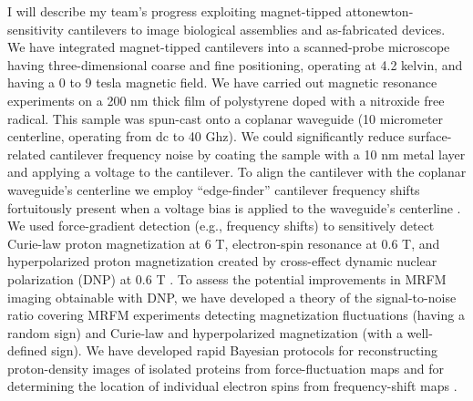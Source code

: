I will describe my team's progress exploiting magnet-tipped attonewton-sensitivity cantilevers \cite{Longenecker_2011,Longenecker_2012} to image biological assemblies and as-fabricated devices.   We have integrated magnet-tipped cantilevers into a scanned-probe microscope having three-dimensional coarse and fine positioning, operating at 4.2 kelvin, and having a 0 to 9 tesla magnetic field.  We have carried out magnetic resonance experiments on a 200 nm thick film of polystyrene doped with a nitroxide free radical.   This sample was spun-cast 
onto a coplanar waveguide (10 micrometer centerline, operating from dc to 40 Ghz).   We could significantly reduce surface-related cantilever frequency noise by coating the sample with a 10 nm metal layer and applying a voltage to the cantilever.  To align the cantilever with the coplanar waveguide's centerline we employ ``edge-finder'' cantilever frequency shifts fortuitously present when a voltage bias is applied to the waveguide's centerline \cite{1710.01442v1}.  We used force-gradient detection (e.g., frequency shifts) to sensitively detect Curie-law proton magnetization at 6 T, electron-spin resonance at 0.6 T, and hyperpolarized proton magnetization created by cross-effect dynamic nuclear polarization (DNP) at 0.6 T \cite{Issac_2016,Isaac_2017}.   To assess the potential improvements in MRFM imaging obtainable with DNP, we have developed a theory of the signal-to-noise ratio covering MRFM experiments detecting magnetization fluctuations (having a random sign) and Curie-law and hyperpolarized magnetization (with a well-defined sign).   We have developed rapid Bayesian protocols for reconstructing proton-density images of isolated proteins from force-fluctuation maps and for determining the location of individual electron spins from frequency-shift maps \cite{Moore_2009}.